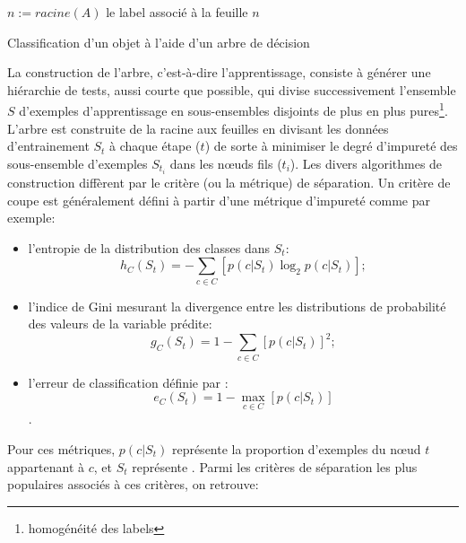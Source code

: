\begin{algorithm}[H] \small
	$n := racine(A)$ \; 
	\Return le label associé à la feuille $n$\;
	\caption{Classification d'un objet à l'aide d'un arbre de décision} \label{algo:sensresultat:classifywithtree}
\end{algorithm}

La construction de l'arbre, c'est-à-dire l'apprentissage, consiste à générer une hiérarchie de tests, aussi courte que possible, qui divise successivement l'ensemble $S$ d'exemples d'apprentissage en sous-ensembles disjoints de plus en plus pures\footnote{homogénéité des labels}. %
L'arbre est construite de la racine aux feuilles en divisant les données d'entrainement $S_{t}$ à chaque étape ($t$) de sorte à minimiser le degré d'impureté des sous-ensemble d'exemples  $S_{t_i}$ dans les nœuds fils ($t_i$). Les divers algorithmes de construction diffèrent par le critère (ou la métrique) de séparation. Un critère de coupe est généralement défini à partir d'une métrique d'impureté comme par exemple:
\begin{itemize}
	\item l'entropie de la distribution des classes dans $S_t$: \[h_C(S_t) = - \sum\limits_{c \in C} \left[p(c \vert S_t) \log_2 p(c \vert S_t)\right];\]
	\item l'indice de Gini mesurant la divergence entre les distributions de probabilité des valeurs de la variable prédite: \[g_C(S_t) = 1 - \sum\limits_{c \in C} \left[p(c \vert S_t)\right]^2;\]
	\item l'erreur de classification définie par : \[e_C(S_t) = 1 - \max\limits_{c \in C} \left[p(c \vert S_t)\right]\]. 
\end{itemize}
Pour ces métriques, $p(c \vert S_t)$ représente la proportion d'exemples du nœud $t$ appartenant à $c$, et $S_t$ représente . Parmi les critères de séparation les plus populaires associés à ces critères, on retrouve: 

